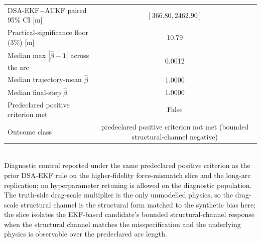 \begin{table}[t]
{\begin{tabular}{lc}
    DSA-EKF$-$AUKF paired 95\% CI [m] & $[366.80, 2462.90]$ \\
    Practical-significance floor (3\%) [m] & 10.79 \\
    Median max $|\hat{\beta}-1|$ across the arc & 0.0012 \\
    Median trajectory-mean $\hat{\beta}$ & 1.0000 \\
    Median final-step $\hat{\beta}$ & 1.0000 \\
    Predeclared positive criterion met & False \\
    Outcome class & predeclared positive criterion not met (bounded structural-channel negative) \\
    \bottomrule
  \end{tabular}
  }
  \\[2pt] {\footnotesize Diagnostic control reported under the same predeclared positive criterion as the prior DSA-EKF rule on the higher-fidelity force-mismatch slice and the long-arc replication; no hyperparameter retuning is allowed on the diagnostic population. The truth-side drag-scale multiplier is the only unmodelled physics, so the drag-scale structural channel is the structural form matched to the synthetic bias here; the slice isolates the EKF-based candidate's bounded structural-channel response when the structural channel matches the misspecification and the underlying physics is observable over the predeclared arc length.}
\end{table}